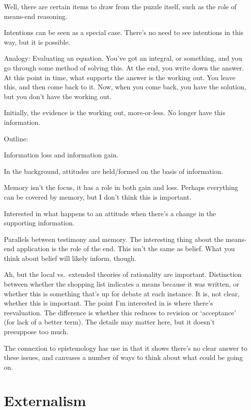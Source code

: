 \documentclass[10pt]{article}
\begin{document}
Well, there are certain items to draw from the puzzle itself, such as the role of means-end reasoning.

Intentions can be seen as a special case.
There's no need to see intentions in this way, but it is possible.


Analogy:
Evaluating an equation.
You've got an integral, or something, and you go through some method of solving this.
At the end, you write down the answer.
At this point in time, what supports the answer is the working out.
You leave this, and then come back to it.
Now, when you come back, you have the solution, but you don't have the working out.

Initially, the evidence is the working out, more-or-less.
No longer have this information.



Outline:

Information loss and information gain.

In the background, attitudes are held/formed on the basis of information.

Memory isn't the focus, it has a role in both gain and loss.
Perhaps everything can be covered by memory, but I don't think this is important.

Interested in what happens to an attitude when there's a change in the supporting information.



Parallels between testimony and memory.
The interesting thing about the means-end application is the role of the end.
This isn't the same as belief.
What you think about belief will likely inform, though.

Ah, but the local vs.\ extended theories of rationality are important.
Distinction between whether the shopping list indicates a means because it was written, or whether this is something that's up for debate at each instance.
It is, not clear, whether this is important.
The point I'm interested in is where there's reevaluation.
The difference is whether this reduces to revision or `acceptance' (for lack of a better term).
The details may matter here, but it doesn't presuppose too much.

The connexion to epistemology has use in that it shows there's no clear answer to these issues, and canvases a number of ways to think about what could be going on.


\section{Externalism}
\label{sec:externalism}
\end{document}
